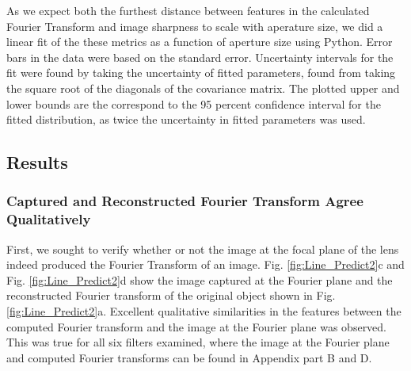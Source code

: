\documentclass[twocolumn,amsmath,amssymb,pra]{revtex4-2}
\begin{document}
As we expect both the furthest distance between features in the calculated Fourier Transform and image sharpness to scale with aperature size, we did a linear fit of the these metrics as a function of aperture size using Python. Error bars in the data were based on the standard error. Uncertainty intervals for the fit were found by taking the uncertainty of fitted parameters, found from taking the square root of the diagonals of the covariance matrix. The plotted upper and lower bounds are the correspond to the 95 percent confidence interval for the fitted distribution, as twice the uncertainty in fitted parameters was used. 

\subsection{Results}

\subsubsection{Captured and Reconstructed Fourier Transform Agree Qualitatively}

First, we sought to verify whether or not the image at the focal plane of the lens indeed produced the Fourier Transform of an image. Fig. \ref{fig:Line_Predict2}c and Fig. \ref{fig:Line_Predict2}d show the image captured at the Fourier plane and the reconstructed Fourier transform of the original object shown in Fig. \ref{fig:Line_Predict2}a. Excellent qualitative similarities in the features between the computed Fourier transform and the image at the Fourier plane was observed. This was true for all six filters examined, where the image at the Fourier plane and computed Fourier transforms can be found in Appendix part B and D.
\end{document}
